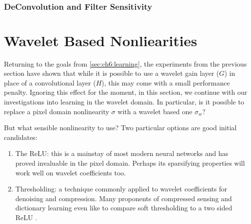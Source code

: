 \begin{figure}
  \centering
  \vspace{-0.5cm}
  \\\vspace{-0.3cm}
  \label{fig:ch6:bp_info}
\end{figure}

\subsubsection{DeConvolution and Filter Sensitivity}

\section{Wavelet Based Nonliearities}
Returning to the goals from \autoref{sec:ch6:learning}, the experiments from the
previous section have shown that while it is possible to use a wavelet gain
layer ($G$) in place of a convolutional layer ($H$), this may come with a small
performance penalty. Ignoring this effect for the moment, in this section, we
continue with our investigations into learning in the wavelet domain. In
particular, is it possible to replace a pixel domain nonlinearity $\sigma$ with
a wavelet based one $\sigma_w$?

But what sensible nonlinearity to use? Two particular options are good initial
candidates:
\begin{enumerate}
  \item The ReLU: this is a mainstay of most modern neural networks and has
    proved invaluable in the pixel domain. Perhaps its sparsifying properties
    will work well on wavelet coefficients too. 
  \item Thresholding: a technique commonly applied to wavelet
    coefficients for denoising and compression. Many proponents of compressed
    sensing and dictionary learning even like to compare soft thresholding to a
    two sided ReLU \cite{papyan_theoretical_2018, papyan_convolutional_2016}.
\end{enumerate}

